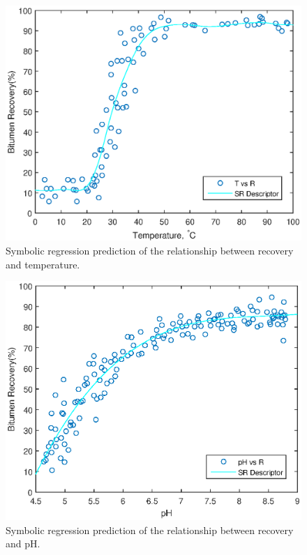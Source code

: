 \documentclass[10pt,journal,compsoc]{IEEEtran}
\begin{document}
  \begin{figure}[tb]
  	\centering
  	\includegraphics[width=\linewidth,clip]{T_SR.eps}
  	\vspace{-2em}
  	\caption{Symbolic regression prediction of the relationship between recovery and temperature.}
  	\label{fig:T_SR}
  \end{figure}
  
  


  
  \begin{figure}[tb]
  	\centering
  	\includegraphics[width=\linewidth,clip]{pH_SR.eps}
  	\vspace{-2em}
  	\caption{Symbolic regression prediction of the relationship between recovery and pH.}
  	\label{fig:pH_SR}
  \end{figure}
  
\end{document}
